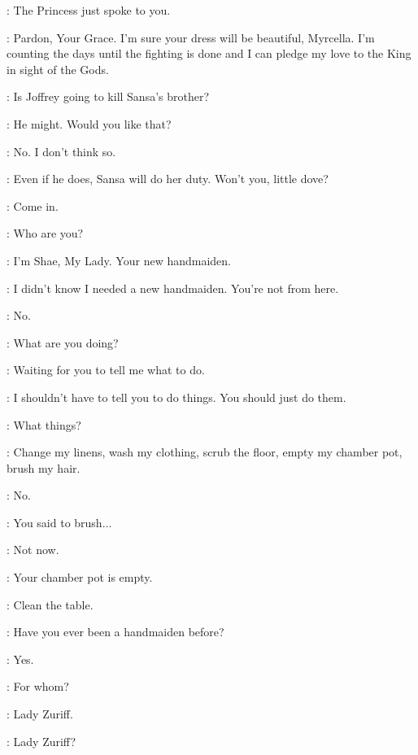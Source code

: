 \CERSEI: The Princess just spoke to you. 

\SANSA: Pardon, Your Grace. I'm sure your dress will be beautiful, Myrcella. I'm counting the days until the fighting is done and I can pledge my love to the King in sight of the Gods. 

\TOMMEN: Is Joffrey going to kill Sansa's brother? 

\CERSEI: He might. Would you like that? 

\TOMMEN: No. I don't think so. 

\CERSEI: Even if he does, Sansa will do her duty. Won't you, little dove? 


\SANSA: Come in. 


\SANSA: Who are you? 

\SHAE: I'm Shae, My Lady. Your new handmaiden. 

\SANSA: I didn't know I needed a new handmaiden. You're not from here. 

\SHAE: No. 

\SANSA: What are you doing? 

\SHAE: Waiting for you to tell me what to do. 

\SANSA: I shouldn't have to tell you to do things. You should just do them. 

\SHAE: What things? 

\SANSA: Change my linens, wash my clothing, scrub the floor, empty my chamber pot, brush my hair. 


\SANSA: No. 

\SHAE: You said to brush$\ldots$  

\SANSA: Not now. 

\SHAE: Your chamber pot is empty. 

\SANSA: Clean the table. 


\SANSA: Have you ever been a handmaiden before? 

\SHAE: Yes. 

\SANSA: For whom? 

\SHAE: Lady Zuriff. 

\SANSA: Lady Zuriff? 

